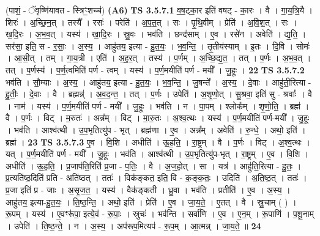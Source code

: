 \documentclass[17pt]{extarticle}
\begin{document}
                  \newline
                      (पाशं॒ - ॅवृष्णि॑यावत - स्त्रिꣳ॒॒शच्च॑)  \textbf{(A6)} \newline \newline
                                \textbf{ TS 3.5.7.1} \newline
                  व॒ष॒ट्का॒र इति॑ वषट् - का॒रः । वै । गा॒य॒त्रि॒यै । शिरः॑ । अ॒च्छि॒न॒त् । तस्यै᳚ । रसः॑ । परेति॑ । अ॒प॒त॒त् । सः । पृ॒थि॒वीम् । प्रेति॑ । अ॒वि॒श॒त् । सः । ख॒दि॒रः । अ॒भ॒व॒त् । यस्य॑ । खा॒दि॒रः । स्रु॒वः । भव॑ति । छन्द॑साम् । ए॒व । रसे॑न । अवेति॑ । द्य॒ति॒ । सर॑सा॒ इति॒ स - र॒साः॒ । अ॒स्य॒ । आहु॑तय॒ इत्या - हु॒त॒यः॒ । भ॒व॒न्ति॒ । तृ॒तीय॑स्याम् । इ॒तः । दि॒वि । सोमः॑ । आ॒सी॒त् । तम् । गा॒य॒त्री । एति॑ । अ॒ह॒र॒त् । तस्य॑ । प॒र्णम् । अ॒च्छि॒द्य॒त॒ । तत् । प॒र्णः । अ॒भ॒व॒त् । तत् । प॒र्णस्य॑ । प॒र्ण॒त्वमिति॑ पर्ण - त्वम् । यस्य॑ । प॒र्ण॒मयीति॑ पर्ण - मयी᳚ । जु॒हूः । \textbf{  22} \newline
                  \newline
                                \textbf{ TS 3.5.7.2} \newline
                  भव॑ति । सौ॒म्याः । अ॒स्य॒ । आहु॑तय॒ इत्या - हु॒त॒यः॒ । भ॒व॒न्ति॒ । जु॒षन्ते᳚ । अ॒स्य॒ । दे॒वाः । आहु॑ती॒रित्या - हु॒तीः॒ । दे॒वाः । वै । ब्रह्मन्न्॑ । अ॒व॒द॒न्त॒ । तत् । प॒र्णः । उपेति॑ । अ॒शृ॒णो॒त् । सु॒श्रवा॒ इति॑ सु - श्रवाः᳚ । वै । नाम॑ । यस्य॑ । प॒र्ण॒मयीति॑ पर्ण - मयी᳚ । जु॒हूः । भव॑ति । न । पा॒पम् । श्लोक᳚म् । शृ॒णो॒ति॒ । ब्रह्म॑ । वै । प॒र्णः । विट् । म॒रुतः॑ । अन्न᳚म् । विट् । मा॒रु॒तः । अ॒श्व॒त्थः । यस्य॑ । प॒र्ण॒मयीति॑ पर्ण-मयी᳚ । जु॒हूः । भव॑ति । आश्व॑त्थी । उ॒प॒भृतित्यु॑प - भृत् । ब्रह्म॑णा । ए॒व । अन्न᳚म् । अवेति॑ । रु॒न्धे॒ । अथो॒ इति॑ । ब्रह्म॑ । \textbf{  23} \newline
                  \newline
                                \textbf{ TS 3.5.7.3} \newline
                  ए॒व । वि॒शि । अधीति॑ । ऊ॒ह॒ति॒ । रा॒ष्ट्रम् । वै । प॒र्णः । विट् । अ॒श्व॒त्थः । यत् । प॒र्ण॒मयीति॑ पर्ण - मयी᳚ । जु॒हूः । भव॑ति । आश्व॑त्थी । उ॒प॒भृतित्यु॑प-भृत् । रा॒ष्ट्रम् । ए॒व । वि॒शि । अधीति॑ । ऊ॒ह॒ति॒ । प्र॒जाप॑ति॒रिति॑ प्र॒जा - प॒तिः॒ । वै । अ॒ज॒हो॒त् । सा । यत्र॑ । आहु॑ति॒रित्या - हु॒तः॒ । प्र॒त्यति॑ष्ठ॒दिति॑ प्रति - अति॑ष्ठत् । ततः॑ । विक॑ङ्कत॒ इति॒ वि - क॒ङ्क॒तः॒ । उदिति॑ । अ॒ति॒ष्ठ॒त् । ततः॑ । प्र॒जा इति॑ प्र - जाः । अ॒सृ॒ज॒त॒ । यस्य॑ । वैक॑ङ्कती । ध्रु॒वा । भव॑ति । प्रतीति॑ । ए॒व । अ॒स्य॒ । आहु॑तय॒ इत्या-हु॒त॒यः॒ । ति॒ष्ठ॒न्ति॒ । अथो॒ इति॑ । प्रेति॑ । ए॒व । जा॒य॒ते॒ । ए॒तत् । वै । स्रु॒चाम् ( ) । रू॒पम् । यस्य॑ । ए॒वꣳरू॑पा॒ इत्ये॒वं - रू॒पाः॒ । स्रुचः॑ । भव॑न्ति । सर्वा॑णि । ए॒व । ए॒न॒म् । रू॒पाणि॑ । प॒शू॒नाम् । उपेति॑ । ति॒ष्ठ॒न्ते॒ । न । अ॒स्य॒ । अप॑रूप॒मित्यप॑ - रू॒प॒म् । आ॒त्मन्न् । जा॒य॒ते॒ ॥ \textbf{  24} \newline
\end{document}
